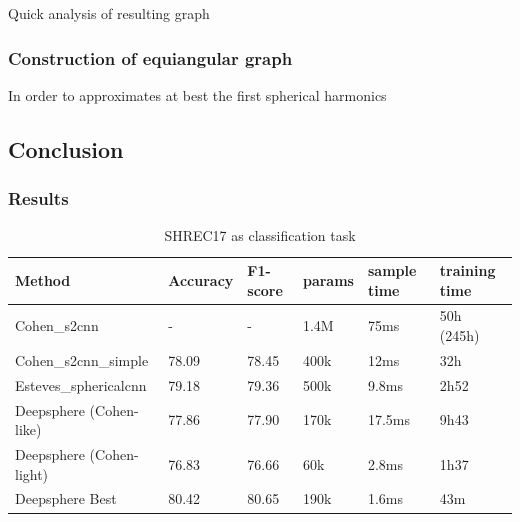 \documentclass[11pt]{report}
\begin{document}
Quick analysis of resulting graph
\subsubsection{Construction of equiangular graph}
In order to approximates at best the first spherical harmonics
\subsection{Conclusion}

\subsubsection{Results}
\begin{table}[ht]
    \centering
    \begin{tabular}{l|l l|l l l}
        Method & Accuracy & F1-score & params & sample time & training time \\ \hline
        Cohen\_s2cnn & - & - & 1.4M & 75ms & 50h (245h)\\
        Cohen\_s2cnn\_simple & 78.09 & 78.45 & 400k & 12ms & 32h\\
        Esteves\_sphericalcnn & 79.18 & 79.36 & 500k & 9.8ms & 2h52\\ \hline
        Deepsphere (Cohen-like) & 77.86 & 77.90 & 170k & 17.5ms & 9h43\\
        Deepsphere (Cohen-light) & 76.83 & 76.66 & 60k & 2.8ms & 1h37\\
        Deepsphere Best & 80.42 & 80.65 & 190k & 1.6ms & 43m
    \end{tabular}
    \caption{SHREC17 as classification task}
    \label{tab:SHREC17_class}
\end{table}
\end{document}
